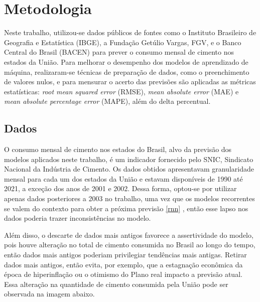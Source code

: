 
\chapter{Metodologia}

Neste trabalho, utilizou-se dados públicos de fontes como o Instituto Brasileiro 
de Geografia e Estatística (IBGE), a Fundação Getúlio Vargas, FGV, e o 
Banco Central do Brasil (BACEN) para prever o consumo mensal de 
cimento nos estados da União. Para melhorar o desempenho dos modelos de 
aprendizado de máquina, realizaram-se técnicas
de preparação de dados, como o preenchimento de valores nulos, e para mensurar 
o acerto das previsões são aplicadas as métricas estatísticas: \textit {root 
mean squared error} (RMSE),  \textit{mean absolute error} (MAE) e \textit{mean 
absolute percentage error} (MAPE), além do delta percentual.


\section{Dados}


O consumo mensal de cimento nos estados do Brasil, alvo da previsão 
dos modelos aplicados neste trabalho, é um indicador fornecido pelo SNIC, 
Sindicato Nacional da Indústria de Cimento. Os dados obtidos apresentavam granularidade
mensal para cada um dos estados da União e estavam disponíveis de 1990 até 2021,
a exceção dos anos de 2001 e 2002. Dessa forma, optou-se por utilizar apenas 
dados posteriores a 2003 no trabalho, uma vez que os modelos recorrentes se 
valem do contexto para obter a próxima previsão \ref{rnn} , então esse lapso nos dados
poderia trazer inconsistências no modelo.

Além disso, o descarte de dados mais antigos favorece a assertividade do 
modelo, pois houve alteração no total de cimento consumida no Brasil
ao longo do tempo, então dados mais antigos poderiam privilegiar tendências 
mais antigas. Retirar dados mais antigos, então evita, por exemplo, que a 
estagnação econômica da época de hiperinflação ou o otimismo do Plano real
impacto a previsão atual. Essa alteração na quantidade de cimento consumida pela União
pode ser observada na imagem abaixo. 

